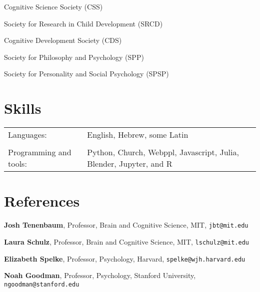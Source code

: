 \documentclass[margin,line,pifont,palatino,courier]{res}
\begin{document}
\begin{resume}
Cognitive Science Society (CSS)

Society for Research in Child Development (SRCD)

Cognitive Development Society (CDS)

Society for Philosophy and Psychology (SPP)

Society for Personality and Social Psychology (SPSP)

\section{\sc Skills}

\begin{tabular}{@{}p{0.8in}p{6in}}

Languages:& English, Hebrew, some Latin\\
\\
Programming and tools:& Python, Church, Webppl, Javascript, Julia, Blender, Jupyter, and R \\

\end{tabular}


\section{\sc References}

{\bf Josh Tenenbaum}, Professor,
Brain and Cognitive Science, MIT,
 \texttt{jbt@mit.edu}

{\bf Laura Schulz}, Professor,
Brain and Cognitive Science, MIT,
 \texttt{lschulz@mit.edu}

{\bf Elizabeth Spelke}, Professor,
Psychology, Harvard,
\texttt{spelke@wjh.harvard.edu}

{\bf Noah Goodman}, Professor,
Psychology, Stanford University,
 \texttt{ngoodman@stanford.edu}\\

\end{resume}
\end{document}
